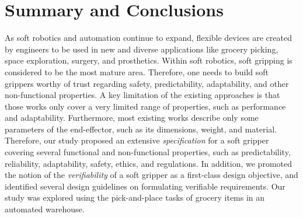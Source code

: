 \documentclass[lettersize,journal]{IEEEtran}
\begin{document}
\section{Summary and Conclusions} \label{summary-conclusions}
As soft robotics and automation continue to expand, flexible devices are created by engineers to be used in new and diverse applications like grocery picking, space exploration, surgery, and prosthetics. 
Within soft robotics, soft gripping is considered to be the most mature area. 
Therefore, one needs to build soft grippers worthy of trust regarding safety, predictability, adaptability, and other non-functional properties. 
A key limitation of the existing approaches is that those works only cover a very limited range of properties, such as performance and adaptability.  
Furthermore, most existing works describe only some parameters of the end-effector, such as its dimensions, weight, and material. 
Therefore, our study proposed an extensive \emph{specification} for a soft gripper covering several functional and non-functional properties, such as predictability, reliability, adaptability, safety, ethics, and regulations. 
In addition, we promoted the notion of the \emph{verifiability} of a soft gripper as a first-class design objective, and identified several design guidelines on formulating verifiable requirements. 
Our study was explored using the pick-and-place tasks of grocery items in an automated warehouse.
\end{document}
